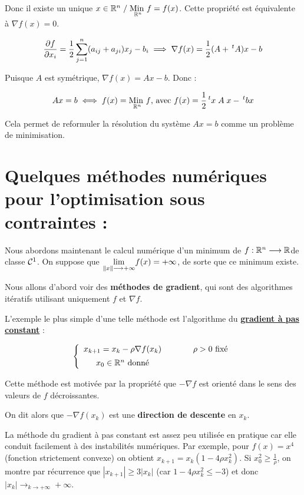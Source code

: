 Donc il existe un unique $x \in \mathbb{R}^n \; / \; \underset{\mathbb{R}^n}{\text{Min }} f = f(x)$.
Cette propriété est équivalente à $\nabla f(x) = 0$. 

\[
    \displaystyle\frac{\partial f}{\partial x_i} = \frac{1}{2} \sum_{j=1}^n (a_{ij} + a_{ji})x_j - b_i
    \implies \nabla f(x) = \frac{1}{2}(A + \,^tA)x - b
\]

Puisque $A$ est symétrique, $\nabla f(x) = Ax - b$. Donc :

\[
    Ax = b \iff f(x) = \underset{\mathbb{R}^n}{\text{Min }} f \text{, avec } f(x) = \frac{1}{2}\,^tx \; A \; x - \,^tb x
\]

Cela permet de reformuler la résolution du système $Ax = b$ comme un problème
de minimisation.

\section{Quelques méthodes numériques pour l'optimisation sous contraintes :}

Nous abordons maintenant le calcul numérique d'un minimum de $f : \mathbb{R}^n \longrightarrow \mathbb{R}$de classe $\mathcal{C}^1$. On suppose que $\underset{\left\lVert x\right\rVert \longrightarrow +\infty}{\lim} f(x) = +\infty$, de sorte que ce minimum existe.

Nous allons d'abord voir des \textbf{méthodes de gradient}, qui sont des
algorithmes itératifs utilisant uniquement $f$ et $\nabla f$.

L'exemple le plus simple d'une telle méthode est l'algorithme du
\underline{\textbf{gradient à pas constant}} :

\[
    \left\lbrace
    \begin{array}{cc}
        x_{k+1} = x_k - \rho \nabla f(x_k) & \hspace{1cm} \rho > 0 \text{ fixé} \\ [5pt]
        x_0 \in \mathbb{R}^n \text{ donné}
    \end{array}
    \right.
\]


Cette méthode est motivée par la propriété que $-\nabla f$ est orienté dans
le sens des valeurs de $f$ décroissantes.

On dit alors que $- \nabla f(x_k)$ est une \textbf{direction de descente} en $x_k$.

La méthode du gradient à pas constant est assez peu utilisée en pratique
car elle conduit facilement à des instabilités numériques. Par exemple,
pour $f(x) = x^4$ (fonction strictement convexe) on obtient $x_{k+1} = x_k(1-4 \rho x_k^2)$. Si $x_0^2 \geq \frac{1}{\rho}$, on montre par récurrence que
$|x_{k+1}| \geq 3 |x_k|$ (car $1-4\rho x_k^2 \leq - 3$) et donc $|x_k| \longrightarrow_{k\to +\infty} + \infty$.

